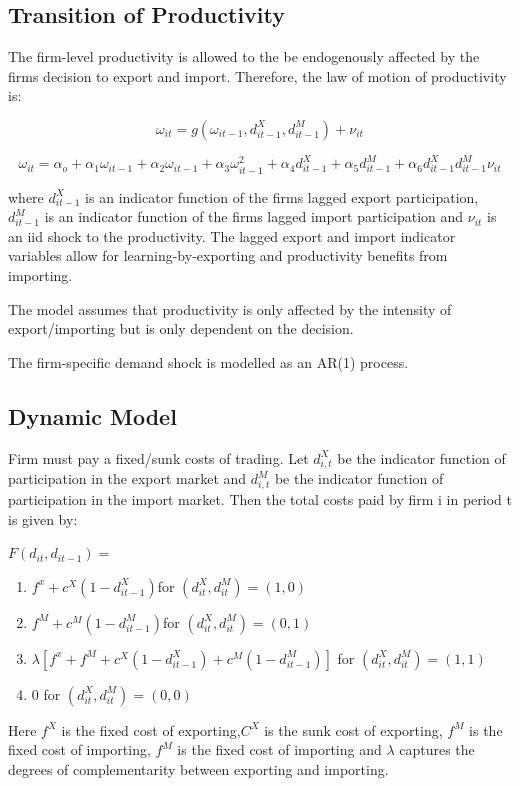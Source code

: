 \documentclass[11pt]{article}
\begin{document}
\subsection{Transition of Productivity}

The firm-level productivity is allowed to the be endogenously affected
by the firms decision to export and import. Therefore, the law of
motion of productivity is:

\begin{equation}
\omega_{it} = g(\omega_{it-1}, d_{it-1}^{X}, d_{it-1}^{M}) + \nu_{it}
\end{equation}

\begin{equation}
\omega_{it} = \alpha_{o} + \alpha_{1}\omega_{it-1} +
\alpha_{2}\omega_{it-1} + \alpha_{3}\omega_{it-1}^{2}+
\alpha_{4}d_{it-1}^{X} + \alpha_{5} d_{it-1}^{M} + \alpha_{6}d_{it-1}^{X}d_{it-1}^{M}  \nu_{it}
\end{equation}

where $d_{it-1}^{X}$ is an indicator function of the firms lagged export
participation, $d_{it-1}^{M}$ is an indicator function of the firms lagged import
participation and $\nu_{it}$ is an iid shock to the productivity. The
lagged export and import indicator variables allow for
learning-by-exporting and productivity benefits from importing. 

The model assumes that productivity is only affected by the intensity
of export/importing but is only dependent on the decision. 

The firm-specific demand shock is modelled as an AR(1) process. 


\subsection{Dynamic Model}
 
Firm must pay a fixed/sunk costs of trading. Let $d_{i,t}^X$ be the
indicator function of participation in the export market and
$d_{i,t}^M$ be the indicator function of participation in the import
market. Then the total costs paid by firm i in period t is given by:


$F(d_{it}, d_{it-1})= $
\begin{enumerate}
\item   $f^{x} + c^{X}(1 - d_{it-1}^X)$\hfill  for $ (d_{it}^X, d_{it}^M) =
  (1,0) $
\item   $f^{M} + c^{M}(1 - d_{it-1}^M)$\hfill  for $ (d_{it}^X, d_{it}^M) =
  (0,1) $
\item   $\lambda[f^{x} + f^{M} + c^{X}(1 - d_{it-1}^X) + c^{M}(1 -
  d_{it-1}^M)]$  \hfill for $ (d_{it}^X, d_{it}^M) =
  (1,1) $
\item   0  \hfill for $ (d_{it}^X, d_{it}^M) =
  (0,0) $
\end{enumerate}
Here $f^{X}$ is the fixed cost of exporting,$C^{X}$ is the sunk cost
of exporting, $f^{M}$ is the fixed cost of importing, $f^{M}$ is the
fixed cost of importing and $\lambda$ captures the degrees of
complementarity between exporting and importing. 
\end{document}
